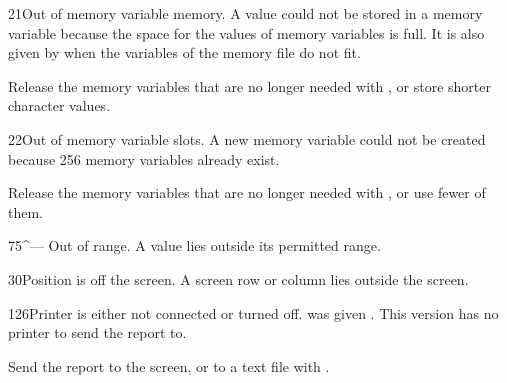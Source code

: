 \begin{XbaseMessageEntry}{21}{Out of memory variable memory.}
A value could not be stored in a memory variable because the space for the values of memory variables is full.  It is also given by  when the variables of the memory file do not fit.

Release the memory variables that are no longer needed with , or store shorter character values.
\end{XbaseMessageEntry}

\begin{XbaseMessageEntry}{22}{Out of memory variable slots.}
A new memory variable could not be created because 256 memory variables already exist.

Release the memory variables that are no longer needed with , or use fewer of them.
\end{XbaseMessageEntry}

\begin{XbaseMessageEntry}{75}{^--- Out of range.}
A value lies outside its permitted range.
\end{XbaseMessageEntry}

\begin{XbaseMessageEntry}{30}{Position is off the screen.}
A screen row or column lies outside the screen.
\end{XbaseMessageEntry}

\begin{XbaseMessageEntry}{126}{Printer is either not connected or turned off.}
 was given . This version has no printer to send the report to.

Send the report to the screen, or to a text file with .
\end{XbaseMessageEntry}

